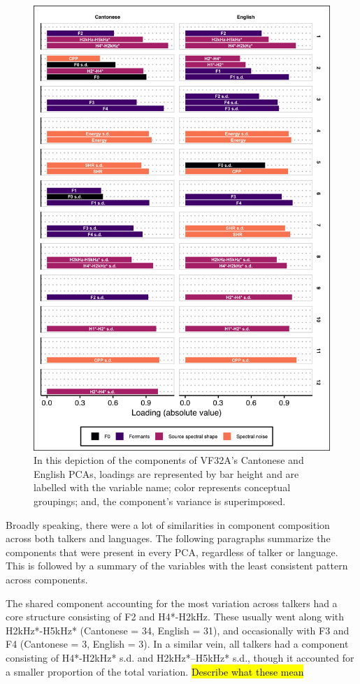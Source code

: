 \begin{figure}[htbp]
\begin{center}
\includegraphics[width=0.875\linewidth]{figures/ch3_pca_vf32a_vert5in.png} 
\caption{In this depiction of the components of VF32A's Cantonese and English PCAs, loadings are represented by bar height and are labelled with the variable name; color represents conceptual groupings; and, the component's variance is superimposed.}
\label{ch3:fig:VF32A}
\end{center}
\end{figure} %

Broadly speaking, there were a lot of similarities in component composition across both talkers and languages. The following paragraphs summarize the components that were present in every PCA, regardless of talker or language. This is followed by a summary of the variables with the least consistent pattern across components. 

The shared component accounting for the most variation across talkers had a core structure consisting of F2 and H4*-H2kHz. These usually went along with H2kHz*-H5kHz* (Cantonese = 34, English = 31), and occasionally with F3 and F4 (Cantonese = 3, English = 3). In a similar vein, all talkers had a component consisting of H4*-H2kHz* s.d. and H2kHz*--H5kHz* s.d., though it accounted for a smaller proportion of the total variation. \hl{Describe what these mean}

